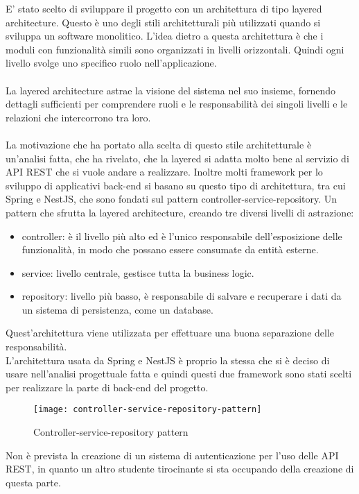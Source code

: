 E' stato scelto di sviluppare il progetto con un architettura di tipo layered architecture. Questo è uno
degli stili architetturali più utilizzati quando si sviluppa un software monolitico. L'idea dietro a 
questa architettura è che i moduli con funzionalità simili sono organizzati in livelli
orizzontali. Quindi ogni livello svolge uno specifico ruolo nell'applicazione.
\\\\
La layered architecture astrae la visione del sistema nel suo insieme, fornendo dettagli 
sufficienti per comprendere ruoli e le responsabilità dei singoli livelli e le relazioni
che intercorrono tra loro.
\\\\
La motivazione che ha portato alla scelta di questo stile architetturale è un'analisi fatta,
che ha rivelato, che la layered si adatta molto bene al servizio di \gls{API} \gls{REST} che
si vuole andare a realizzare. Inoltre molti framework per lo sviluppo di applicativi \gls{back-end} si basano su questo tipo di architettura, tra cui
Spring e NestJS, che sono fondati sul pattern controller-service-repository. Un pattern
che sfrutta la layered architecture, creando tre diversi livelli di astrazione: 
\begin{itemize}
    \item controller: è il livello più alto ed è l'unico responsabile dell'esposizione delle
        funzionalità, in modo che possano essere consumate da entità esterne.
    \item service: livello centrale, gestisce tutta la business logic.
    \item repository: livello più basso, è responsabile di salvare e recuperare i dati da un
        sistema di persistenza, come un database.
\end{itemize}
\leavevmode\newline
Quest'architettura viene utilizzata per effettuare una buona separazione delle responsabilità.
\\
L'architettura usata da Spring e NestJS è proprio la stessa che si è deciso di usare nell'analisi progettuale fatta 
 e quindi questi due framework sono stati scelti per realizzare
la parte di \gls{back-end} del progetto.
\leavevmode\newline
\begin{figure}[H]
    \centering
    \texttt{[image: controller-service-repository-pattern]}
    \caption{Controller-service-repository pattern}
\end{figure}
\leavevmode\newline
Non è prevista la creazione di un sistema di autenticazione per l'uso delle \gls{API} \gls{REST}, in quanto 
un altro studente tirocinante si sta occupando della creazione di questa parte.

